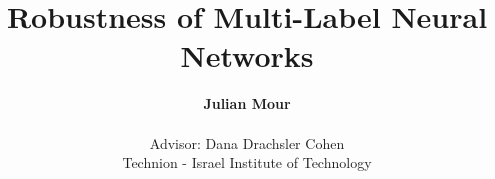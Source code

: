 \documentclass[11pt]{article}
\begin{document}
\title{Robustness of Multi-Label Neural Networks}

\author{
    \textbf{Julian Mour} \\
    \\
    Advisor: Dana Drachsler Cohen\\
    Technion - Israel Institute of Technology
}

\maketitle

\small















\end{document}

